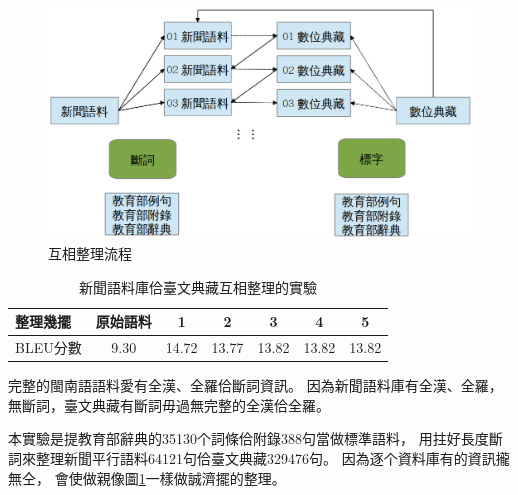 \begin{figure}
\centerline{\includegraphics[keepaspectratio,width=40em]{圖/互相整理架構}}
\caption{互相整理流程}
\label{圖：互相整理架構}
\end{figure}

\begin{table}
\caption{新聞語料庫佮臺文典藏互相整理的實驗}
\label{表：互相整理實驗}
\centering
\begin{tabular}{l|cccccc}
整理幾擺 & 原始語料 & 1 & 2 & 3 & 4 & 5\\
\hline
BLEU分數 & 9.30 & 14.72 & 13.77 & 13.82 & 13.82 & 13.82\\
\end{tabular}
\end{table}



完整的閩南語語料愛有全漢、全羅佮斷詞資訊。
因為新聞語料庫有全漢、全羅，無斷詞，臺文典藏有斷詞毋過無完整的全漢佮全羅。


本實驗是提教育部辭典的35130个詞條佮附錄388句當做標準語料，
用拄好長度斷詞來整理新聞平行語料64121句佮臺文典藏329476句。
因為逐个資料庫有的資訊攏無仝，
會使做親像圖\ref{圖：互相整理架構}一樣做誠濟擺的整理。


